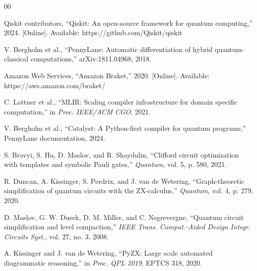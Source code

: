 \documentclass[conference]{IEEEtran}
\begin{document}
\begin{thebibliography}{00}

Qiskit contributors, ``Qiskit: An open-source framework for quantum computing,'' 2024.
[Online]. Available: https://github.com/Qiskit/qiskit

V. Bergholm et al., ``PennyLane: Automatic differentiation of hybrid quantum-classical
computations,'' arXiv:1811.04968, 2018.

Amazon Web Services, ``Amazon Braket,'' 2020. [Online]. Available:
https://aws.amazon.com/braket/

C. Lattner et al., ``MLIR: Scaling compiler infrastructure for domain specific computation,''
in \textit{Proc. IEEE/ACM CGO}, 2021.

V. Bergholm et al., ``Catalyst: A Python-first compiler for quantum programs,'' PennyLane
documentation, 2024.

S. Bravyi, S. Hu, D. Maslov, and R. Shaydulin, ``Clifford circuit optimization with templates
and symbolic Pauli gates,'' \textit{Quantum}, vol. 5, p. 580, 2021.

R. Duncan, A. Kissinger, S. Perdrix, and J. van de Wetering, ``Graph-theoretic simplification
of quantum circuits with the ZX-calculus,'' \textit{Quantum}, vol. 4, p. 279, 2020.

D. Maslov, G. W. Dueck, D. M. Miller, and C. Negrevergne, ``Quantum circuit simplification
and level compaction,'' \textit{IEEE Trans. Comput.-Aided Design Integr. Circuits Syst.},
vol. 27, no. 3, 2008.

A. Kissinger and J. van de Wetering, ``PyZX: Large scale automated diagrammatic reasoning,''
in \textit{Proc. QPL 2019}, EPTCS 318, 2020.

\end{thebibliography}
\end{document}
